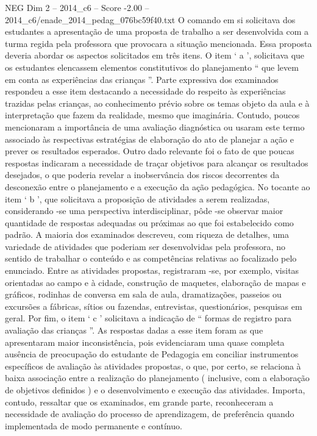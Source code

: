 \begin{textsample}{NEG Dim 2 – 2014\_c6 – Score -2.00 – 2014\_c6/enade\_2014\_pedag\_076bc59f40.txt}
O comando em si solicitava dos estudantes a apresentação de uma proposta de trabalho a ser desenvolvida com a turma regida pela professora que provocara a situação mencionada.
Essa proposta deveria abordar os aspectos solicitados em três itens.
O item ‘ a ’, solicitava que os estudantes elencassem elementos constitutivos do planejamento “ que levem em conta as experiências das crianças ”.
Parte expressiva dos examinados respondeu a esse item destacando a necessidade do respeito às experiências trazidas pelas crianças, ao conhecimento prévio sobre os temas objeto da aula e à interpretação que fazem da realidade, mesmo que imaginária.
Contudo, poucos mencionaram a importância de uma avaliação diagnóstica ou usaram este termo associado às respectivas estratégias de elaboração do ato de planejar a ação e prever os resultados esperados.
Outro dado relevante foi o fato de que poucas respostas indicaram a necessidade de traçar objetivos para alcançar os resultados desejados, o que poderia revelar a inobservância dos riscos decorrentes da desconexão entre o planejamento e a execução da ação pedagógica.
No tocante ao item ‘ b ’, que solicitava a proposição de atividades a serem realizadas, considerando -se uma perspectiva interdisciplinar, pôde -se observar maior quantidade de respostas adequadas ou próximas ao que foi estabelecido como padrão.
A maioria dos examinados descreveu, com riqueza de detalhes, uma variedade de atividades que poderiam ser desenvolvidas pela professora, no sentido de trabalhar o conteúdo e as competências relativas ao focalizado pelo enunciado.
Entre as atividades propostas, registraram -se, por exemplo, visitas orientadas ao campo e à cidade, construção de maquetes, elaboração de mapas e gráficos, rodinhas de conversa em sala de aula, dramatizações, passeios ou excursões a fábricas, sítios ou fazendas, entrevistas, questionários, pesquisas em geral.
Por fim, o item ‘ c ’ solicitava a indicação de “ formas de registro para avaliação das crianças ”.
As respostas dadas a esse item foram as que apresentaram maior inconsistência, pois evidenciaram uma quase completa ausência de preocupação do estudante de Pedagogia em conciliar instrumentos específicos de avaliação às atividades propostas, o que, por certo, se relaciona à baixa associação entre a realização do planejamento ( inclusive, com a elaboração de objetivos definidos ) e o desenvolvimento e execução das atividades.
Importa, contudo, ressaltar que os examinados, em grande parte, reconheceram a necessidade de avaliação do processo de aprendizagem, de preferência quando implementada de modo permanente e contínuo.

\end{textsample}
